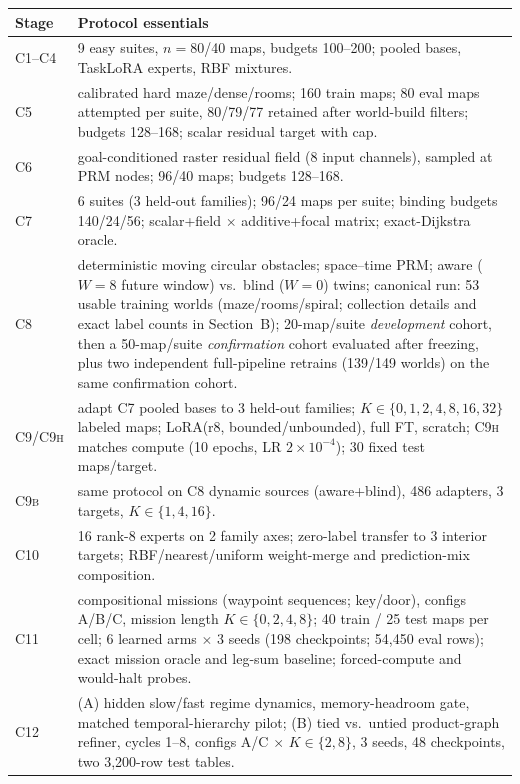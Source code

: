 \documentclass[letterpaper]{article} %
\newcommand{\stage}[1]{\textsc{#1}}
\begin{document}
\begin{table}[t]
\centering
\small
\begin{tabular}{@{}lp{14.2cm}@{}}
\toprule
Stage & Protocol essentials \\
\midrule
\stage{C1--C4} & 9 easy suites, $n{=}80$/40 maps, budgets 100--200; pooled bases, TaskLoRA experts, RBF mixtures. \\
\stage{C5} & calibrated hard maze/dense/rooms; 160 train maps; 80 eval maps attempted per suite, 80/79/77 retained after world-build filters; budgets 128--168; scalar residual target with cap. \\
\stage{C6} & goal-conditioned raster residual field (8 input channels), sampled at PRM nodes; 96/40 maps; budgets 128--168. \\
\stage{C7} & 6 suites (3 held-out families); 96/24 maps per suite; binding budgets 140/24/56; scalar+field $\times$ additive+focal matrix; exact-Dijkstra oracle. \\
\stage{C8} & deterministic moving circular obstacles; space--time PRM; aware ($W{=}8$ future window) vs.\ blind ($W{=}0$) twins; canonical run: 53 usable training worlds (maze/rooms/spiral; collection details and exact label counts in Section~B); 20-map/suite \emph{development} cohort, then a 50-map/suite \emph{confirmation} cohort evaluated after freezing, plus two independent full-pipeline retrains (139/149 worlds) on the same confirmation cohort. \\
\stage{C9/C9h} & adapt \stage{C7} pooled bases to 3 held-out families; $K \in \{0, 1, 2, 4, 8, 16, 32\}$ labeled maps; LoRA(r8, bounded/unbounded), full FT, scratch; \stage{C9h} matches compute (10 epochs, LR $2{\times}10^{-4}$); 30 fixed test maps/target. \\
\stage{C9b} & same protocol on \stage{C8} dynamic sources (aware+blind), 486 adapters, 3 targets, $K\in\{1,4,16\}$. \\
\stage{C10} & 16 rank-8 experts on 2 family axes; zero-label transfer to 3 interior targets; RBF/nearest/uniform weight-merge and prediction-mix composition. \\
\stage{C11} & compositional missions (waypoint sequences; key/door), configs A/B/C, mission length $K\in\{0,2,4,8\}$; 40 train / 25 test maps per cell; 6 learned arms $\times$ 3 seeds (198 checkpoints; 54{,}450 eval rows); exact mission oracle and leg-sum baseline; forced-compute and would-halt probes. \\
\stage{C12} & (A) hidden slow/fast regime dynamics, memory-headroom gate, matched temporal-hierarchy pilot; (B) tied vs.\ untied product-graph refiner, cycles 1--8, configs A/C $\times$ $K\in\{2,8\}$, 3 seeds, 48 checkpoints, two 3{,}200-row test tables. \\

\end{tabular}
\end{table}
\end{document}
